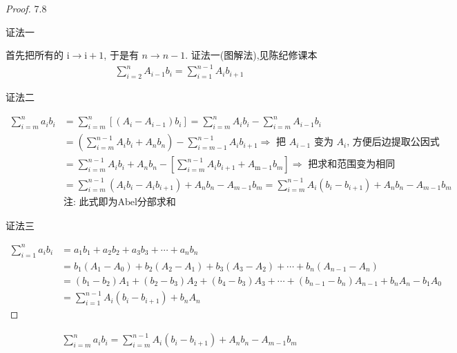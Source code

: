 \begin{proof}\num{7, 8}

证法一

首先把所有的 $\mathrm{i}\rightarrow \mathrm{i}+1 $, 于是有 $n\to n-1$. 证法一(图解法),见陈纪修课本
\begin{align*}
    \sum_{i=2}^{n} A_{i-1} b_{i}=\sum_{i=1}^{n-1} A_{i} b_{i+1}
\end{align*}


证法二

\begin{align*}
    \sum_{i=m}^{n} a_{i} b_{i} 
    &=\sum_{i=m}^{n}\left[\left(A_{i}-A_{i-1}\right) b_{i}\right]
        = \sum_{i=m}^{n} A_{i} b_{i}-\sum_{i=m}^{n} A_{i-1} b_{i} \\
    &=\left(\sum_{i=m}^{n-1} A_{i} b_{i}+A_{n} b_{n}\right)-\sum_{i=m-1}^{n-1} A_{i} b_{i+1}
        \Longrightarrow\text { 把 } A_{i-1} \text { 变为 } A_{i} \text {, 方便后边提取公因式 } \\
    &=\sum_{i=m}^{n-1} A_{i} b_{i}+A_{n} b_{n}-\left[\sum_{i=m}^{n-1} A_{i} b_{i+1}+A_{\mathrm{m}-1} b_{m}\right]
        \Longrightarrow\text { 把求和范围变为相同 } \\
    & =\sum_{i=m}^{n-1}\left(A_{i} b_{i}-A_{i} b_{i+1}\right)+A_{n} b_{n}-A_{m-1} b_{m}
        =\sum_{i=m}^{n-1} A_{i}\left(b_{i}-b_{i+1}\right)+A_{n} b_{n}-A_{m-1} b_{m}\\
    &\mbox{注: 此式即为Abel分部求和}
\end{align*}

 
证法三

\begin{align*}
    \sum_{i=1}^n a_i b_i
    &=a_1 b_1+a_2 b_2+a_3 b_3+\cdots+a_n b_n \\
    &=b_1\left(A_1-A_0\right)+b_2\left(A_2-A_1\right)
        +b_3\left(A_3-A_2\right)+\cdots+b_n\left(A_{n-1}-A_n\right) \\
    &=\left(b_1-b_2\right) A_1+\left(b_2-b_3\right) A_2+\left(b_4-b_3\right) A_3
        +\cdots+\left(b_{n-1}-b_n\right) A_{n-1}+b_n A_n-b_1 A_0 \\
    &=\sum_{i=1}^{n-1} A_i\left(b_i-b_{i+1}\right)+b_n A_n
\end{align*}
\end{proof}


\begin{theorem}[Abel分部求和]
    \begin{align}
        \sum_{i=m}^{n}{a_ib_i}=\sum_{i=m}^{n-1} A_{i}\left(b_{i}-b_{i+1}\right)+A_{n} b_{n}-A_{m-1} b_{m}
    \end{align}
\end{theorem}

